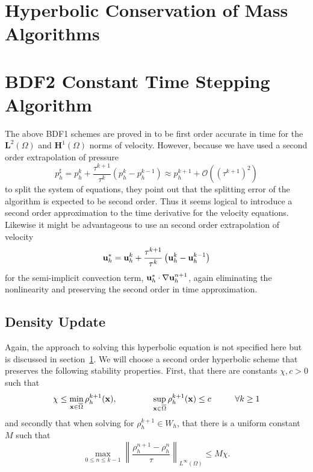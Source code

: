 \documentclass[letterpaper]{erdc}
\begin{document}
\section{Hyperbolic Conservation of Mass Algorithms}\label{sec:ConservationOfMassNumericalApproach}



%
%
\section{BDF2 Constant Time Stepping Algorithm}\label{sec:BDF2ConstantTimeSteppingAlgorithm}

The above BDF1 schemes are proved in \cite{guermond2011error} to be first order accurate in time for the $\mathbf{L}^2(\Omega)$ and $\mathbf{H}^1(\Omega)$ norms of velocity.  However, because we have used a second order extrapolation of pressure
\begin{equation}
  p^{\sharp}_h = p_h^{k} + \frac{\tau^{k+1}}{\tau^{k}}\left( p_h^{k} - p_h^{k-1} \right) \approx p_h^{k+1} + \mathcal{O}\left(\left(\tau^{k+1}\right)^2 \right)
\end{equation}
to split the system of equations, they point out that the splitting error of the algorithm is expected to be second order.  Thus it seems logical to introduce a second order approximation to the time derivative for the velocity equations.  Likewise it might be advantageous to use an second order extrapolation of velocity 
\begin{equation}
  \textbf{u}^{*}_h = \textbf{u}_h^{k} + \frac{\tau^{k+1}}{\tau^{k}}\left( \textbf{u}_h^{k} - \textbf{u}_h^{k-1} \right)
\end{equation}
for the semi-implicit convection term, $\textbf{u}_h^{*}\cdot\nabla\textbf{u}_h^{n+1}$, again eliminating the nonlinearity and preserving the second order in time approximation.


\subsection{Density Update}
Again, the approach to solving this hyperbolic equation is not specified here but is discussed in section~\ref{sec:ConservationOfMassNumericalApproach}.  We will choose a second order hyperbolic scheme that preserves the following stability properties.  First, that there are constants $\chi, c > 0$ such that 
\begin{equation}
  \chi \leq \displaystyle\min_{\textbf{x}\in\overline{\Omega}} \rho_h^{k+1}(\textbf{x}),  \hspace{1.5cm} \displaystyle\sup_{\textbf{x}\in\overline{\Omega}}\rho_h^{k+1}(\textbf{x}) \leq c \hspace{1cm} \forall k\geq 1
\end{equation}
and secondly that when solving for $\rho_h^{k+1}\in W_h$, that there is a uniform constant $M$ such that
\begin{equation}
  \displaystyle\max_{0\leq n\leq k-1} \left \| \frac{\rho_h^{n+1} - \rho_h^{n}}{\tau}\right\|_{L^{\infty}(\Omega)} \leq M\chi.
\end{equation}
\end{document}

